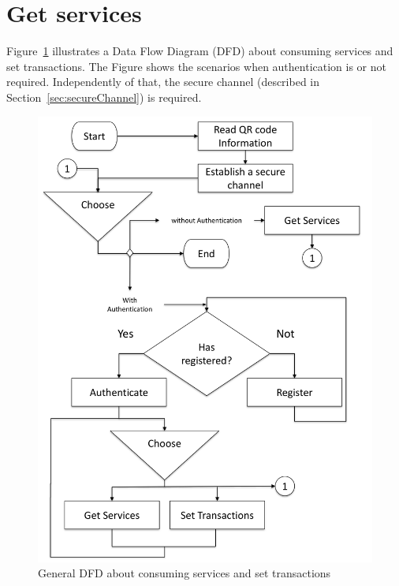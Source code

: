 \section{Get services}
\label{sec:getServices}
Figure~\ref{fig:dfdForAuthServices} illustrates a Data Flow Diagram (DFD) about consuming  
services and set transactions. The Figure shows the scenarios when authentication is or 
not required. Independently of that, the secure channel (described in Section~\ref{sec:secureChannel}) 
is required.

\begin{figure}[hb]
  \centering
    \includegraphics[scale=0.35]{images/lopez3.png}
        \caption{General DFD about consuming services and set transactions}
    \label{fig:dfdForAuthServices}
\end{figure}

